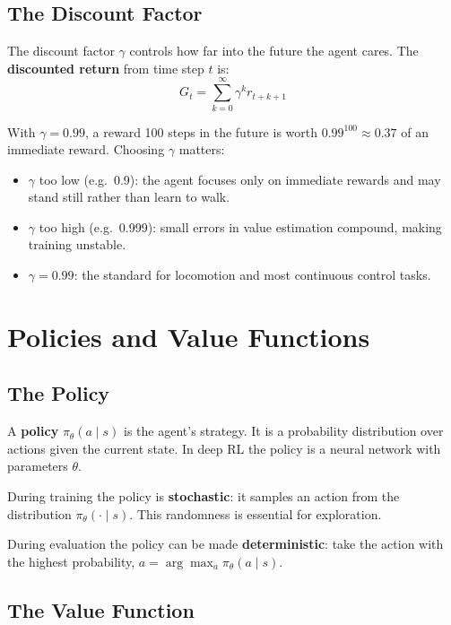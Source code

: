 \documentclass[12pt, a4paper]{article}
\begin{document}
\subsection{The Discount Factor}

The discount factor $\gamma$ controls how far into the future the agent cares. The \textbf{discounted return} from time step $t$ is:
\[
G_t = \sum_{k=0}^{\infty} \gamma^k r_{t+k+1}
\]

With $\gamma = 0.99$, a reward 100 steps in the future is worth $0.99^{100} \approx 0.37$ of an immediate reward. Choosing $\gamma$ matters:

\begin{itemize}
    \item $\gamma$ too low (e.g.\ 0.9): the agent focuses only on immediate rewards and may stand still rather than learn to walk.
    \item $\gamma$ too high (e.g.\ 0.999): small errors in value estimation compound, making training unstable.
    \item $\gamma = 0.99$: the standard for locomotion and most continuous control tasks.
\end{itemize}

\section{Policies and Value Functions}

\subsection{The Policy}

A \textbf{policy} $\pi_\theta(a \mid s)$ is the agent's strategy. It is a probability distribution over actions given the current state. In deep RL the policy is a neural network with parameters $\theta$.

During training the policy is \textbf{stochastic}: it samples an action from the distribution $\pi_\theta(\cdot \mid s)$. This randomness is essential for exploration.

During evaluation the policy can be made \textbf{deterministic}: take the action with the highest probability, $a = \arg\max_a \pi_\theta(a \mid s)$.

\subsection{The Value Function}
\end{document}
